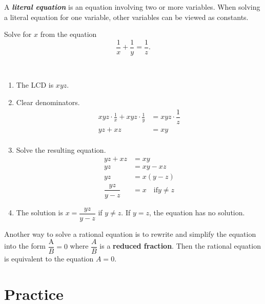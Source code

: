 \documentclass[en,11pt]{elegantbook}
\newcommand{\size}[2]{{\fontsize{#1}{0}\selectfont#2}}
\newenvironment{rmdnote}{
	\vspace*{0.5\baselineskip}
    \par\noindent
    \makebox[-3pt][r]{\color{red!90}\size{8}{\textdbend}\,\,}
    \begin{tcolorbox}[
    title={\textbf{\color{second}Note}},
    title style={left color=blue!10!green!20!white,right color=yellow!20!blue!20!white},
    colback=red!10!white,
    ]
    \itshape
}{
    \end{tcolorbox}
    \par\ignorespacesafterend
}
\let\BeginKnitrBlock\begin \let\EndKnitrBlock\end
\begin{document}
A \textbf{\emph{literal equation}} is an equation involving two or more variables. When solving a literal equation for one variable, other variables can be viewed as constants.

\BeginKnitrBlock{example}
\protect\hypertarget{exm:unnamed-chunk-144}{}{\label{exm:unnamed-chunk-144} }
Solve for \(x\) from the equation
\[
\frac{1}{x}+\frac{1}{y}=\dfrac{1}{z}.
\]
\EndKnitrBlock{example}

\BeginKnitrBlock{solution}
{}\\

\begin{enumerate}
\def\labelenumi{\arabic{enumi}.}

\item
  The LCD is \(xyz\).
\item
  Clear denominators.
  \[
       \begin{aligned}
           xyz\cdot\frac{1}{x}+xyz\cdot\frac{1}{y}&=xyz\cdot\dfrac{1}{z}\\
           yz+xz&=xy\\
       \end{aligned}
   \]
\item
  Solve the resulting equation.
  \[
       \begin{aligned}
           yz+xz&=xy\\
           yz&=xy-xz\\
           yz&=x(y-z)\\
           \dfrac{yz}{y-z}&=x \quad \text{if} y\neq z
       \end{aligned}
   \]
\item
  The solution is \(x=\dfrac{yz}{y-z}\) if \(y\neq z\). If \(y=z\), the equation has no solution.
\end{enumerate}
\EndKnitrBlock{solution}

\begin{rmdnote}

Another way to solve a rational equation is to rewrite and simplify the equation into the form \(\dfrac{\text{A}}{B}=0\) where \(\dfrac{A}{B}\) is a \textbf{reduced fraction}. Then the rational equation is equivalent to the equation \(A=0\).

\end{rmdnote}

\newpage

\hypertarget{practice-6}{%
\section{Practice}\label{practice-6}}
\end{document}
